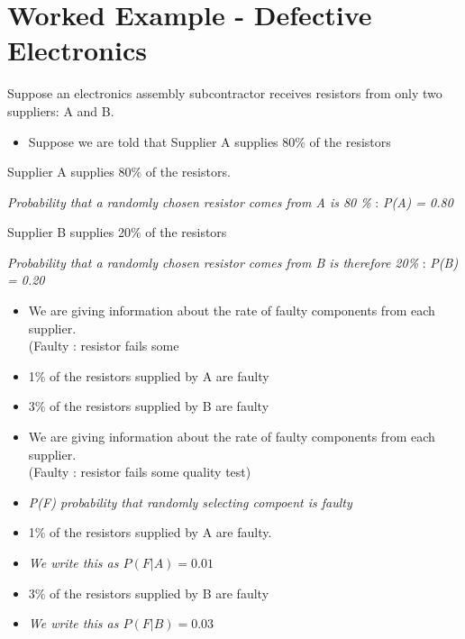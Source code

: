 \documentclass[]{report}
\begin{document}


\section*{Worked Example  - Defective Electronics}
Suppose an electronics assembly subcontractor receives resistors from only two suppliers: A and B.

\begin{itemize}
\item Suppose we are told that Supplier A supplies 80\% of the resistors



\end{itemize}

\begin{framed}
\begin{itemize}
\item Supplier A supplies 80\% of the resistors.
{


\item \textit{Probability that a randomly chosen resistor comes from A is 80 \%} : \textit{P(A) = 0.80 }

}
\item Supplier B supplies 20\% of the resistors
\item \textit{Probability that a randomly chosen resistor comes from B is therefore 20\%} : \textit{P(B) = 0.20}
\end{itemize}
\end{framed}



\begin{itemize}
\item We are giving information about the rate of faulty components from each supplier. \\(Faulty : resistor fails some 
\item 1\% of the resistors supplied by A are faulty

\item 3\% of the resistors supplied by B are faulty 
\vspace{1cm}
\end{itemize}

\begin{itemize}
\item We are giving information about the rate of faulty components from each supplier. \\(Faulty : resistor fails some quality test)
\item  \textit{P(F) probability that randomly selecting compoent is faulty}
\item 1\% of the resistors supplied by A are faulty.
\item\textit{ We write this as $P(F|A) =0.01$}
\item 3\% of the resistors supplied by B are faulty 
\item \textit{We write this as $P(F|B) =0.03$}
\end{itemize}
\end{document}
